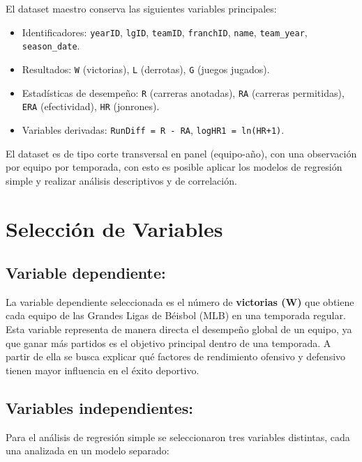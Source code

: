 \documentclass[10pt]{article}
\begin{document}
El dataset maestro conserva las siguientes variables principales:
\begin{itemize}
    \item Identificadores: \texttt{yearID}, \texttt{lgID}, \texttt{teamID}, \texttt{franchID}, \texttt{name}, \texttt{team\_year}, \texttt{season\_date}.
    \item Resultados: \texttt{W} (victorias), \texttt{L} (derrotas), \texttt{G} (juegos jugados).
    \item Estadísticas de desempeño: \texttt{R} (carreras anotadas), \texttt{RA} (carreras permitidas), \texttt{ERA} (efectividad), \texttt{HR} (jonrones).
    \item Variables derivadas: \texttt{RunDiff = R - RA}, \texttt{logHR1 = ln(HR+1)}.
\end{itemize}

El dataset es de tipo corte transversal en panel (equipo-año), con una observación por equipo por temporada, con esto es posible aplicar los modelos de regresión simple y realizar análisis descriptivos y de correlación.
\section{Selección de Variables}
\subsection{Variable dependiente:}
La variable dependiente seleccionada es el número de \textbf{victorias (W)} que obtiene cada equipo de las Grandes Ligas de Béisbol (MLB) en una temporada regular. Esta variable representa de manera directa el desempeño global de un equipo, ya que ganar más partidos es el objetivo principal dentro de una temporada. A partir de ella se busca explicar qué factores de rendimiento ofensivo y defensivo tienen mayor influencia en el éxito deportivo.
\subsection{Variables independientes:}
Para el análisis de regresión simple se seleccionaron tres variables distintas, cada una analizada en un modelo separado:%
\end{document}
